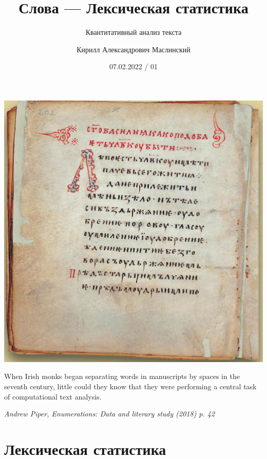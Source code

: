 \documentclass[svgnames]{beamer}
\title[CTA 01] %
{Слова — Лексическая статистика}
\subtitle
{Квантитативный анализ текста} %
\author%
{Кирилл Александрович Маслинский}
\institute%
{Институт русской литературы (Пушкинский Дом) РАН}
\date%
{07.02.2022 / 01}
\begin{document}
\begin{frame}
  \titlepage
\end{frame}

\begin{frame}[plain]
  \centering
  \Huge\bfseries
\end{frame}


\begin{frame}
  \centering
  \includegraphics[height=.95\textheight]{izbornik1076}
\end{frame}

\begin{frame}[standout]
  When Irish monks began separating words in manuscripts
by spaces in the seventh century, little could they know
that they were performing a central task of computational
text analysis.

\textit{Andrew Piper, Enumerations: Data and literary study (2018) p. 42}
\end{frame}

\section{Лексическая статистика}
\end{document}
